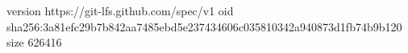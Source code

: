version https://git-lfs.github.com/spec/v1
oid sha256:3a81efc29b7b842aa7485ebd5e237434606c035810342a940873d1fb74b9b120
size 626416
